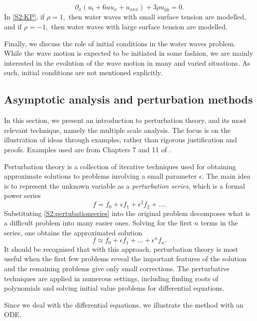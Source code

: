 \documentclass[11pt,reqno,oneside,a4paper]{article}
\begin{document}
\begin{itemize}
\begin{equation}\label{S2:KP}
\partial_x(u_t + 6uu_x + u_{xxx}) + 3 \rho u_{yy} = 0.
\end{equation}
In \eqref{S2:KP}, if $\rho = 1,$ then water waves with small surface tension are modelled, and if $\rho = -1,$ then water waves with large surface tension are modelled.
\end{itemize}
Finally, we discuss the role of initial conditions in the water waves problem. While the wave motion is expected to be initiated in some fashion, we are mainly interested in the evolution of the wave motion in many and varied situations. As such, initial conditions are not mentioned explicitly. 

\subsection{Asymptotic analysis and perturbation methods}
In this section, we present an introduction to perturbation theory, and its most relevant technique, namely the multiple scale analysis. The focus is on the illustration of ideas through examples, rather than rigorous justification and proofs. Examples used are from Chapters 7 and 11 of \cite{BO}.

Perturbation theory is a collection of iterative techniques used for obtaining approximate solutions to problems involving a small parameter $\epsilon$. The main idea is to represent the unknown variable as a \textit{perturbation series}, which is a formal power series 
\begin{equation}\label{S2:pertubationseries}
f = f_0 + \epsilon f_1 + \epsilon^2 f_2 + \ldots.
\end{equation} 
Substituting \eqref{S2:pertubationseries} into the original problem decomposes what is a difficult problem  into many easier ones. Solving for the first $n$ terms in the series, one obtains the approximated solution 
\[f \approx f_0 + \epsilon f_1 + \ldots + \epsilon^n f_n.\]
It should be recognised that with this approach, perturbation theory is most useful when the first few problems reveal the important features of the solution and the remaining problems give only small corrections. The perturbative techniques are applied in numerous settings, including finding roots of polynomials and solving initial value problems for differential equations.

Since we deal with the differential equations, we illustrate the method with an ODE.

\label{S2:example}
\end{document}
